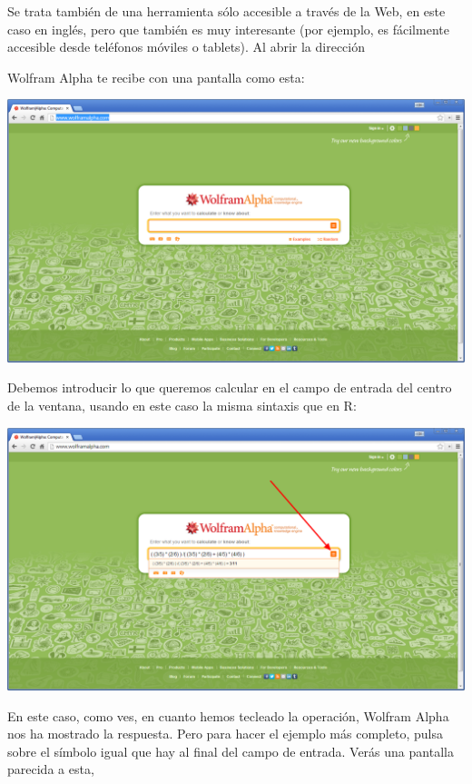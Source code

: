 \documentclass[10pt,a4paper]{article}\usepackage[]{graphicx}\usepackage[]{color}
\begin{document}
Se trata también de una herramienta sólo accesible a través de la Web, en este caso en inglés, pero que también es muy interesante (por ejemplo, es fácilmente accesible desde teléfonos móviles o tablets). Al abrir la dirección
\begin{center}
\end{center}
Wolfram Alpha te recibe con una pantalla como esta:
    \begin{center}
    \includegraphics[width=15.5cm]{../fig/Tut04-15.png}
    \end{center}
Debemos introducir lo que queremos calcular en el campo de entrada del centro de la ventana, usando en este caso la misma sintaxis que en R:
    \begin{center}
    \includegraphics[width=15.5cm]{../fig/Tut04-16.png}
    \end{center}
En este caso, como ves, en cuanto hemos tecleado la operación, Wolfram Alpha nos ha mostrado la respuesta. Pero para hacer el ejemplo más completo, pulsa sobre el símbolo igual que hay al final del campo de entrada. Verás una pantalla parecida a esta,
\end{document}
